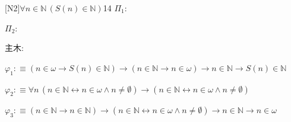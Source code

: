\begin{fullproof}{[N2]}{$\forall n \in \mathbb{N}\,(S(n) \in \mathbb{N})$}{14}\label{tree:NatS}
\noindent$\Pi_{1}$:
\begin{ptree}
\end{ptree}
\noindent$\Pi_{2}$:
\begin{ptree}
\end{ptree}
\noindent 主木:
\begin{ptree}
\noLine
{}
\noLine
{}
\end{ptree}
\begin{abbrevlist}
\item $\varphi_{1} :\equiv (n \in \omega \to S(n) \in \mathbb{N}) \to (n \in \mathbb{N} \to n \in \omega) \to n \in \mathbb{N} \to S(n) \in \mathbb{N}$
\item $\varphi_{2} :\equiv \forall n\,(n \in \mathbb{N} \leftrightarrow n \in \omega \land n \neq \emptyset) \to (n \in \mathbb{N} \leftrightarrow n \in \omega \land n \neq \emptyset)$
\item $\varphi_{3} :\equiv (n \in \mathbb{N} \to n \in \mathbb{N}) \to (n \in \mathbb{N} \leftrightarrow n \in \omega \land n \neq \emptyset) \to n \in \mathbb{N} \to n \in \omega$
\end{abbrevlist}
\end{fullproof}

